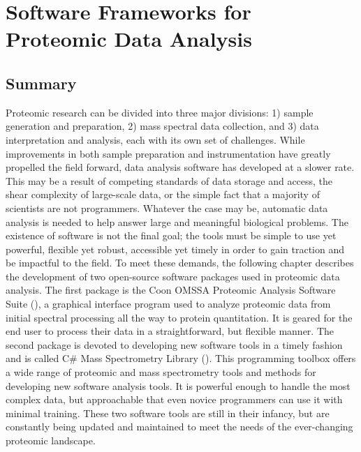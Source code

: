 \chapter{Software Frameworks for Proteomic Data Analysis}

\section{Summary}
Proteomic research can be divided into three major divisions: 1) sample generation and preparation, 2) mass spectral data collection, and 3) data interpretation and analysis, each with its own set of challenges. While improvements in both sample preparation and instrumentation have greatly propelled the field forward, data analysis software has developed at a slower rate. This may be a result of competing standards of data storage and access, the shear complexity of large-scale data, or the simple fact that a majority of scientists are not programmers. Whatever the case may be, automatic data analysis is needed to help answer large and meaningful biological problems. The existence of software is not the final goal; the tools must be simple to use yet powerful, flexible yet robust, accessible yet timely in order to gain traction and be impactful to the field. To meet these demands, the following chapter describes the development of two open-source software packages used in proteomic data analysis. The first package is the Coon OMSSA Proteomic Analysis Software Suite (\compass{}), a graphical interface program used to analyze proteomic data from initial spectral processing all the way to protein quantitation. It is geared for the end user to process their data in a straightforward, but flexible manner. The second package is devoted to developing new software tools in a timely fashion and is called C\# Mass Spectrometry Library (\csmsl{}). This programming toolbox offers a wide range of proteomic and mass spectrometry tools and methods for developing new software analysis tools. It is powerful enough to handle the most complex data, but approachable that even novice programmers can use it with minimal training. These two software tools are still in their infancy, but are constantly being updated and maintained to meet the needs of the ever-changing proteomic landscape.

